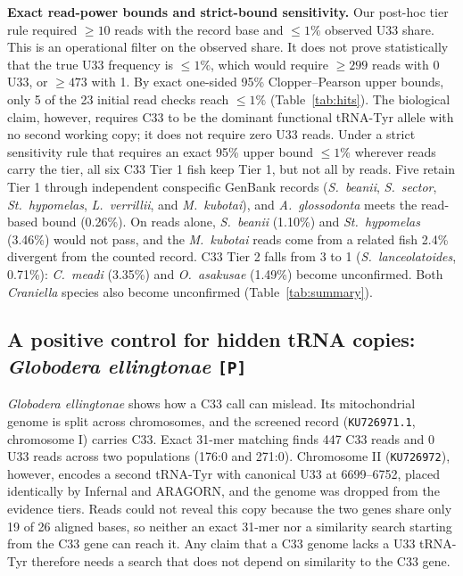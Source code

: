 \documentclass[11pt, a4paper]{article}
\begin{document}
\textbf{Exact read-power bounds and strict-bound sensitivity.} Our post-hoc tier rule required $\ge 10$ reads with the record base and $\le 1\%$ observed U33 share. This is an operational filter on the observed share. It does not prove statistically that the true U33 frequency is $\le 1\%$, which would require $\ge 299$ reads with 0 U33, or $\ge 473$ with 1. By exact one-sided 95\% Clopper--Pearson upper bounds, only 5 of the 23 initial read checks reach $\le 1\%$ (Table~\ref{tab:hits}). The biological claim, however, requires C33 to be the dominant functional tRNA-Tyr allele with no second working copy; it does not require zero U33 reads. Under a strict sensitivity rule that requires an exact 95\% upper bound $\le 1\%$ wherever reads carry the tier, all six C33 Tier 1 fish keep Tier 1, but not all by reads. Five retain Tier 1 through independent conspecific GenBank records (\textit{S.\ beanii}, \textit{S.\ sector}, \textit{St.\ hypomelas}, \textit{L.\ verrillii}, and \textit{M.\ kubotai}), and \textit{A.\ glossodonta} meets the read-based bound (0.26\%). On reads alone, \textit{S.\ beanii} (1.10\%) and \textit{St.\ hypomelas} (3.46\%) would not pass, and the \textit{M.\ kubotai} reads come from a related fish 2.4\% divergent from the counted record. C33 Tier 2 falls from 3 to 1 (\textit{S.\ lanceolatoides}, 0.71\%): \textit{C.\ meadi} (3.35\%) and \textit{O.\ asakusae} (1.49\%) become unconfirmed. Both \textit{Craniella} species also become unconfirmed (Table~\ref{tab:summary}).

\subsection{A positive control for hidden tRNA copies: \textit{Globodera ellingtonae} \texttt{[P]}}\label{sec:glob}
\textit{Globodera ellingtonae} shows how a C33 call can mislead. Its mitochondrial genome is split across chromosomes, and the screened record (\texttt{KU726971.1}, chromosome I) carries C33. Exact 31-mer matching finds 447 C33 reads and 0 U33 reads across two populations (176:0 and 271:0). Chromosome II (\texttt{KU726972}), however, encodes a second tRNA-Tyr with canonical U33 at 6699--6752, placed identically by Infernal and ARAGORN, and the genome was dropped from the evidence tiers. Reads could not reveal this copy because the two genes share only 19 of 26 aligned bases, so neither an exact 31-mer nor a similarity search starting from the C33 gene can reach it. Any claim that a C33 genome lacks a U33 tRNA-Tyr therefore needs a search that does not depend on similarity to the C33 gene.
\end{document}
